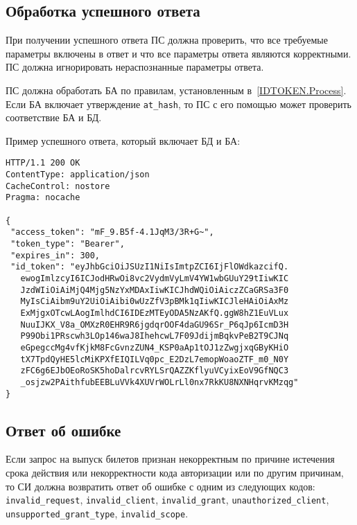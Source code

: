\subsection{Обработка успешного ответа}\label{REQRESP.Token.Resp}

При получении успешного ответа ПС должна проверить, что все
требуемые параметры включены в ответ и что все параметры ответа являются
корректными. ПС должна игнорировать нераспознанные параметры ответа.

ПС должна обработать БА по правилам, установленным в~\ref{IDTOKEN.Process}.
%
Если БА включает утверждение \lstinline{at_hash}, то ПС с его помощью 
может проверить соответствие БА и БД.

Пример успешного ответа, который включает БД и БА:
%
\begin{lstlisting}
HTTP/1.1 200 OK
ContentType: application/json
CacheControl: nostore
Pragma: nocache

{
 "access_token": "mF_9.B5f-4.1JqM3/3R+G~",
 "token_type": "Bearer",
 "expires_in": 300,
 "id_token": "eyJhbGciOiJSUzI1NiIsImtpZCI6IjFlOWdkazcifQ.
   ewogImlzcyI6ICJodHRwOi8vc2VydmVyLmV4YW1wbGUuY29tIiwKIC
   JzdWIiOiAiMjQ4Mjg5NzYxMDAxIiwKICJhdWQiOiAiczZCaGRSa3F0
   MyIsCiAibm9uY2UiOiAibi0wUzZfV3pBMk1qIiwKICJleHAiOiAxMz
   ExMjgxOTcwLAogImlhdCI6IDEzMTEyODA5NzAKfQ.ggW8hZ1EuVLux
   NuuIJKX_V8a_OMXzR0EHR9R6jgdqrOOF4daGU96Sr_P6qJp6IcmD3H
   P99Obi1PRscwh3LOp146waJ8IhehcwL7F09JdijmBqkvPeB2T9CJNq
   eGpegccMg4vfKjkM8FcGvnzZUN4_KSP0aAp1tOJ1zZwgjxqGByKHiO
   tX7TpdQyHE5lcMiKPXfEIQILVq0pc_E2DzL7emopWoaoZTF_m0_N0Y
   zFC6g6EJbOEoRoSK5hoDalrcvRYLSrQAZZKflyuVCyixEoV9GfNQC3
   _osjzw2PAithfubEEBLuVVk4XUVrWOLrLl0nx7RkKU8NXNHqrvKMzqg"
}
\end{lstlisting}

\subsection{Ответ об ошибке}\label{REQRESP.Token.Error}

Если запрос на выпуск билетов признан некорректным по причине 
истечения срока действия или некорректности кода авторизации
или по другим причинам, то СИ должна возвратить ответ об ошибке с одним из 
следующих кодов:
\lstinline{invalid_request}, %
\lstinline{invalid_client}, %
\lstinline{invalid_grant}, %
\lstinline{unauthorized_client}, %
\lstinline{unsupported_grant_type}, %
\lstinline{invalid_scope}. %
